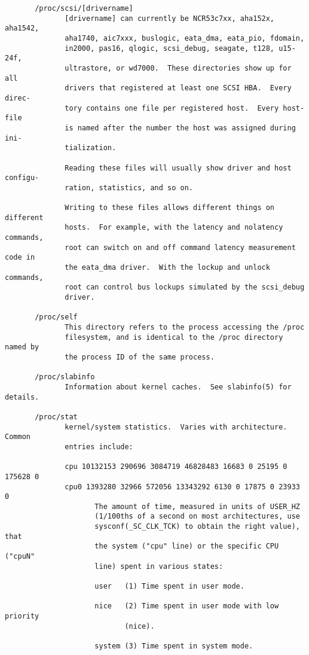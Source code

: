 \documentclass[]{article}
\begin{document}
\begin{verbatim}
       /proc/scsi/[drivername]
              [drivername] can currently be NCR53c7xx, aha152x, aha1542,
              aha1740, aic7xxx, buslogic, eata_dma, eata_pio, fdomain,
              in2000, pas16, qlogic, scsi_debug, seagate, t128, u15-24f,
              ultrastore, or wd7000.  These directories show up for all
              drivers that registered at least one SCSI HBA.  Every direc‐
              tory contains one file per registered host.  Every host-file
              is named after the number the host was assigned during ini‐
              tialization.

              Reading these files will usually show driver and host configu‐
              ration, statistics, and so on.

              Writing to these files allows different things on different
              hosts.  For example, with the latency and nolatency commands,
              root can switch on and off command latency measurement code in
              the eata_dma driver.  With the lockup and unlock commands,
              root can control bus lockups simulated by the scsi_debug
              driver.

       /proc/self
              This directory refers to the process accessing the /proc
              filesystem, and is identical to the /proc directory named by
              the process ID of the same process.

       /proc/slabinfo
              Information about kernel caches.  See slabinfo(5) for details.

       /proc/stat
              kernel/system statistics.  Varies with architecture.  Common
              entries include:

              cpu 10132153 290696 3084719 46828483 16683 0 25195 0 175628 0
              cpu0 1393280 32966 572056 13343292 6130 0 17875 0 23933 0
                     The amount of time, measured in units of USER_HZ
                     (1/100ths of a second on most architectures, use
                     sysconf(_SC_CLK_TCK) to obtain the right value), that
                     the system ("cpu" line) or the specific CPU ("cpuN"
                     line) spent in various states:

                     user   (1) Time spent in user mode.

                     nice   (2) Time spent in user mode with low priority
                            (nice).

                     system (3) Time spent in system mode.


\end{verbatim}
\end{document}
